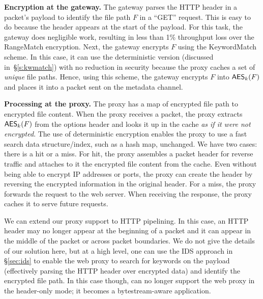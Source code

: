 \noindent\textbf{Encryption at the gateway.} 
The gateway parses the HTTP header in a packet's payload to identify the file path $F$ in a ``GET'' request. 
This is easy to do because the header appears at the start of the payload. For this task, the gateway does negligible work, resulting in less than 1\% throughput loss over the RangeMatch encryption. 
Next, the gateway encrypts $F$ using the KeywordMatch scheme. In this case, it can use the deterministic version (discussed in~\S\ref{s:kwmatch}) with no reduction in security because the proxy caches a set of {\em unique} file paths. Hence, using this scheme, the gateway encrypts $F$ into $\mathsf{AES}_k(F)$ and places it into a packet sent on the metadata channel. %

\noindent\textbf{Processing at the proxy.} The proxy has a map of encrypted file path to encrypted file content. When the proxy receives a packet, the proxy extracts $\mathsf{AES}_k(F)$ from the options header and looks it up in the cache {\em as if it were not encrypted}. The use of deterministic encryption enables the proxy to use a fast search data structure/index, such as a hash map, unchanged. We have two cases: there is a hit or a miss. For hit, the proxy assembles a packet header for reverse traffic and attaches to it the encrypted file content from the cache. Even without being able to encrypt IP addresses or ports, the proxy can create the header by reversing the encrypted information in the original header.
For a miss, the proxy forwards the request to the web server. When receiving the response, the proxy caches it to serve future requests.

We can extend our proxy support to HTTP pipelining. %
In this case,  an HTTP header may no longer appear at the beginning of a packet and it can appear in the middle of the packet or across packet boundaries. We do not give the details of our solution here, but at a high level, one can use the IDS approach in \S\ref{sec:ids} to enable the web proxy to search for keywords on the payload  (effectively parsing the HTTP header over encrypted data) and identify the encrypted file path. In this case though, \sys can no longer support the web proxy in the header-only mode; it becomes a bytestream-aware application. 
























